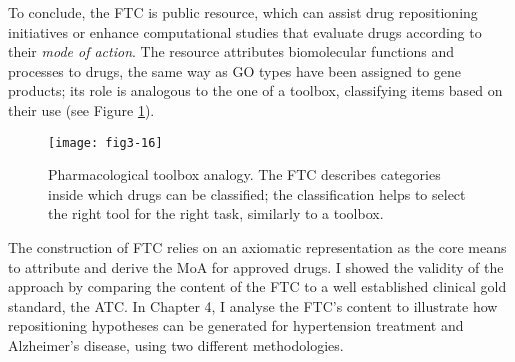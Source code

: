 To conclude, the FTC is public resource, which can assist drug repositioning initiatives or enhance computational studies that evaluate drugs according to their \emph{mode of action}. The resource attributes biomolecular functions and processes to drugs, the same way as GO types have been assigned to gene products; its role is analogous to the one of a toolbox, classifying items based on their use (see Figure \ref{fig3-16}).

\begin{figure}[H]
    \centering
    \texttt{[image: fig3-16]}
    \caption{Pharmacological toolbox analogy. The FTC describes categories inside which drugs can be classified; the classification helps to select the right tool for the right task, similarly to a toolbox.}
    \label{fig3-16}
\end{figure}

The construction of FTC relies on an axiomatic representation as the core means to attribute and derive the MoA for approved drugs. I showed the validity of the approach by comparing the content of the FTC to a well established clinical gold standard, the ATC. In Chapter 4, I analyse the FTC's content to illustrate how repositioning hypotheses can be generated for hypertension treatment and Alzheimer's disease, using two different methodologies.


